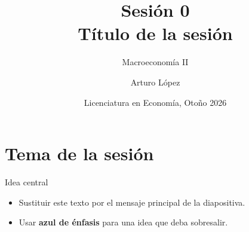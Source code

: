 \documentclass[aspectratio=169,11pt]{beamer}
\title[Macroeconomía II]{Sesión 0 \\ Título de la sesión}
\subtitle{Macroeconomía II}
\author[LECO]{Arturo López}
\institute[CIDE]{Centro de Investigación y Docencia Económicas (CIDE)}
\date[Otoño 2026]{Licenciatura en Economía, Otoño 2026}
\newcommand{\cidehighlight}[1]{\textcolor{CIDEBlue}{\bfseries #1}}
\begin{document}

\begin{frame}
  \titlepage
\end{frame}


\section{Tema de la sesión}

\begin{frame}{Idea central}
  \begin{itemize}
    \item Sustituir este texto por el mensaje principal de la diapositiva.
    \item Usar \cidehighlight{azul de énfasis} para una idea que deba sobresalir.
  \end{itemize}
\end{frame}
\end{document}
